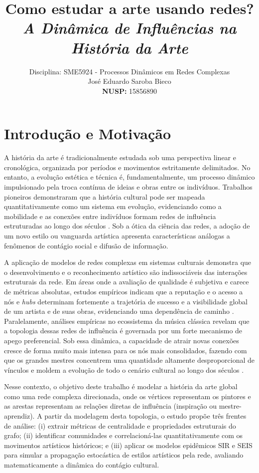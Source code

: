 \documentclass[12pt,a4paper]{article}
\title{\textbf{Como estudar a arte usando redes?}\\ \large \textit{A Dinâmica de Influências na História da Arte}}
\author{Disciplina: SME5924 - Processos Dinâmicos em Redes Complexas \\ José Eduardo Saroba Bieco \\ \textbf{NUSP:} 15856890}
\begin{document}
\maketitle

\section{Introdução e Motivação}
\label{sec:introducao}

A história da arte é tradicionalmente estudada sob uma perspectiva linear e cronológica, organizada por períodos e movimentos estritamente delimitados. No entanto, a evolução estética e técnica é, fundamentalmente, um processo dinâmico impulsionado pela troca contínua de ideias e obras entre os indivíduos. Trabalhos pioneiros demonstraram que a história cultural pode ser mapeada quantitativamente como um sistema em evolução, evidenciando como a mobilidade e as conexões entre indivíduos formam redes de influência estruturadas ao longo dos séculos \cite{schich2014network}. Sob a ótica da ciência das redes, a adoção de um novo estilo ou vanguarda artística apresenta características análogas a fenômenos de contágio social e difusão de informação.

A aplicação de modelos de redes complexas em sistemas culturais demonstra que o desenvolvimento e o reconhecimento artístico são indissociáveis das interações estruturais da rede. Em áreas onde a avaliação de qualidade é subjetiva e carece de métricas absolutas, estudos empíricos indicam que a reputação e o acesso a nós e \textit{hubs} determinam fortemente a trajetória de sucesso e a visibilidade global de um artista e de suas obras, evidenciando uma dependência de caminho \cite{Fraiberger2018, jach2018quantifying}. Paralelamente, análises empíricas no ecossistema da música clássica revelam que a topologia dessas redes de influência é governada por um forte mecanismo de apego preferencial. Sob essa dinâmica, a capacidade de atrair novas conexões cresce de forma muito mais intensa para os nós mais consolidados, fazendo com que os grandes mestres concentrem uma quantidade altamente desproporcional de vínculos e moldem a evolução de todo o cenário cultural ao longo dos séculos \cite{park2015}.


Nesse contexto, o objetivo deste trabalho é modelar a história da arte global como uma rede complexa direcionada, onde os vértices representam os pintores e as arestas representam as relações diretas de influência (inspiração ou mestre-aprendiz). A partir da modelagem desta topologia, o estudo propõe três frentes de análise: (i) extrair métricas de centralidade e propriedades estruturais do grafo; (ii) identificar comunidades e correlacioná-las quantitativamente com os movimentos artísticos históricos; e (iii) aplicar os modelos epidêmicos SIR e SEIS para simular a propagação estocástica de estilos artísticos pela rede, avaliando matematicamente a dinâmica do contágio cultural.
\end{document}

